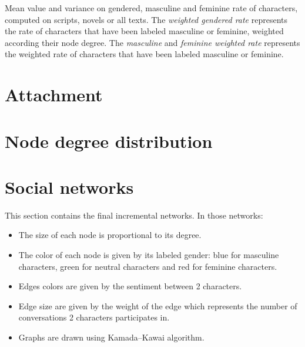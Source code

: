 \documentclass[a4paper, 12pt]{report}
\begin{document}
\begin{appendices}
\begin{table}[]
\caption{Mean value and variance on gendered, masculine and feminine rate of characters, computed on scripts, novels or all texts. The \textit{weighted gendered rate} represents the rate of characters that have been labeled masculine or feminine, weighted according their node degree. The \textit{masculine} and \textit{feminine weighted rate} represents the weighted rate of characters that have been labeled masculine or feminine. }
 \label{gender_all_weighted}
\end{table}












\chapter{Attachment}
\label{ref_attachement}
%




\chapter{Node degree distribution}
\label{a_degree}
%






\chapter{Social networks}
This section contains the final incremental networks. In those networks:
\begin{itemize}
\item The size of each node is proportional to its degree.
\item The color of each node is given by its labeled gender: blue for masculine characters, green for neutral characters and red for feminine characters.
\item Edges colors are given by the sentiment between 2 characters.
\item Edge size are given by the weight of the edge which represents the number of conversations 2 characters participates in.
\item Graphs are drawn using Kamada–Kawai algorithm. 
\end{itemize}
\label{final_sn}
%




\end{appendices} 
\end{document}
